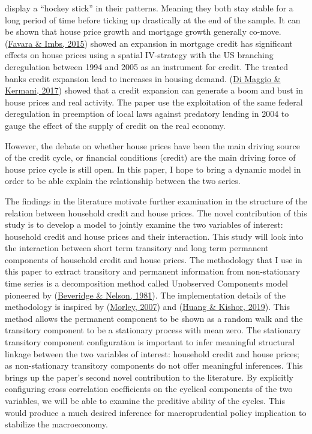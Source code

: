 \documentclass[
  12pt,
]{article}
\begin{document}
display a ``hockey stick'' in their patterns. Meaning they both stay stable for a long period of time before ticking up drastically at the end of the sample. It can be shown that house price growth and mortgage growth generally co-move. (\protect\hyperlink{ref-favara_credit_2015}{Favara \& Imbs, 2015}) showed an expansion in mortgage credit has significant effects on house prices using a spatial IV-strategy with the US branching deregulation between 1994 and 2005 as an instrument for credit. The treated banks credit expansion lead to increases in housing demand. (\protect\hyperlink{ref-di_maggio_credit-induced_2017}{Di Maggio \& Kermani, 2017}) showed that a credit expansion can generate a boom and bust in house prices and real activity. The paper use the exploitation of the same federal deregulation in preemption of local laws against predatory lending in 2004 to gauge the effect of the supply of credit on the real economy.

However, the debate on whether house prices have been the main driving source of the credit cycle, or financial conditions (credit) are the main driving force of house price cycle is still open. In this paper, I hope to bring a dynamic model in order to be able explain the relationship between the two series.

The findings in the literature motivate further examination in the structure of the relation between household credit and house prices. The novel contribution of this study is to develop a model to jointly examine the two variables of interest: household credit and house prices and their interaction. This study will look into the interaction between short term transitory and long term permanent components of household credit and house prices. The methodology that I use in this paper to extract transitory and permanent information from non-stationary time series is a decomposition method called Unobserved Components model pioneered by (\protect\hyperlink{ref-beveridge_new_1981}{Beveridge \& Nelson, 1981}). The implementation details of the methodology is inspired by (\protect\hyperlink{ref-morley_slow_2007}{Morley, 2007}) and (\protect\hyperlink{ref-huang_rise_2019}{Huang \& Kishor, 2019}). This method allows the permanent component to be shown as a random walk and the transitory component to be a stationary process with mean zero. The stationary transitory component configuration is important to infer meaningful structural linkage between the two variables of interest: household credit and house prices; as non-stationary transitory components do not offer meaningful inferences. This brings up the paper's second novel contribution to the literature. By explicitly configuring cross correlation coefficients on the cyclical components of the two variables, we will be able to examine the preditive ability of the cycles. This would produce a much desired inference for macroprudential policy implication to stabilize the macroeconomy.
\end{document}
